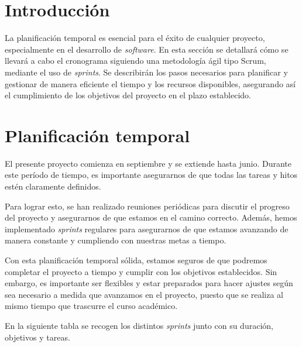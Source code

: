 

\section{Introducción}

La planificación temporal es esencial para el éxito de cualquier proyecto, especialmente en el desarrollo de \textit{software}. En esta sección se detallará cómo se llevará a cabo el cronograma siguiendo una metodología ágil tipo Scrum, mediante el uso de \textit{sprints}. Se describirán los pasos necesarios para planificar y gestionar de manera eficiente el tiempo y los recursos disponibles, asegurando así el cumplimiento de los objetivos del proyecto en el plazo establecido.


\section{Planificación temporal}

El presente proyecto comienza en septiembre y se extiende hasta junio. Durante este período de tiempo, es importante asegurarnos de que todas las tareas y hitos estén claramente definidos.

Para lograr esto, se han realizado reuniones periódicas para discutir el progreso del proyecto y asegurarnos de que estamos en el camino correcto. Además, hemos implementado \textit{sprints} regulares para asegurarnos de que estamos avanzando de manera constante y cumpliendo con nuestras metas a tiempo.

Con esta planificación temporal sólida, estamos seguros de que podremos completar el proyecto a tiempo y cumplir con los objetivos establecidos. Sin embargo, es importante ser flexibles y estar preparados para hacer ajustes según sea necesario a medida que avanzamos en el proyecto, puesto que se realiza al mismo tiempo que trascurre el curso académico.

En la siguiente tabla se recogen los distintos \textit{sprints} junto con su duración, objetivos y tareas.

